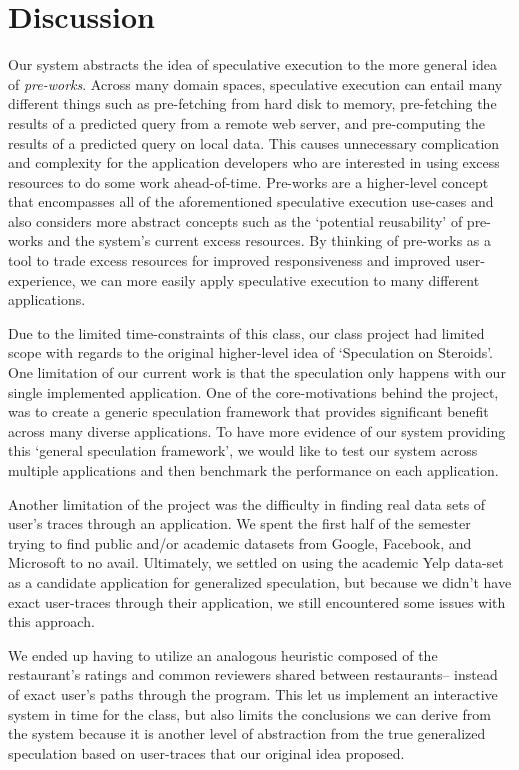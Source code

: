 \section{Discussion}
\label{sec:discuss}
Our system abstracts the idea of speculative execution to the more general idea
of {\it pre-works}. Across many domain spaces, speculative execution can entail many
different things such as pre-fetching from hard disk to memory, pre-fetching
the results of a predicted query from a remote web server, and pre-computing
the results of a predicted query on local data. This causes unnecessary
complication and complexity for the application developers who are interested in
using excess resources to do some work ahead-of-time. Pre-works are a
higher-level concept that encompasses all of the aforementioned speculative
execution use-cases and also considers more abstract concepts such as the
`potential reusability' of pre-works and the system's current excess
resources. By thinking of pre-works as a tool to trade excess resources for
improved responsiveness and improved user-experience, we can more easily apply
speculative execution to many different applications.

Due to the limited time-constraints of this class, our class project had
limited scope with regards to the original higher-level idea of `Speculation
on Steroids'. One limitation of our current work is that the speculation only
happens with our single implemented application. One of the core-motivations
behind the project, was to create a generic speculation framework that
provides significant benefit across many diverse applications. To have more
evidence of our system providing this `general speculation framework', we
would like to test our system across multiple applications and then benchmark
the performance on each application. 

Another limitation of the project was the difficulty in finding real data sets
of user’s traces through an application. We spent the first half of the
semester trying to find public and/or academic datasets from Google, Facebook,
and Microsoft to no avail. Ultimately, we settled on using the academic Yelp
data-set as a candidate application for generalized speculation, but because
we didn’t have exact user-traces through their application, we still
encountered some issues with this approach. 

We ended up having to utilize an analogous heuristic composed of the
restaurant’s ratings and common reviewers shared between restaurants-- instead
of exact user’s paths through the program. This let us implement an interactive
system in time for the class, but also limits the conclusions we can derive from
the system because it is another level of abstraction from the true generalized
speculation based on user-traces that our original idea proposed.

